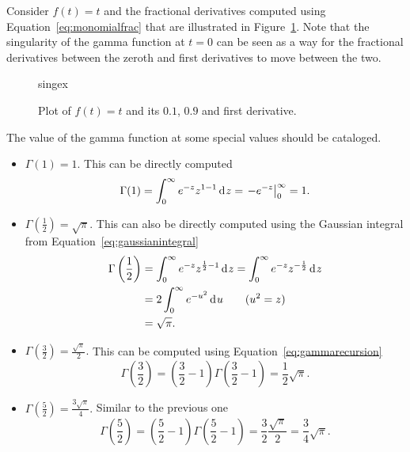 \begin{example}
  Consider $f(t) = t$ and the fractional derivatives computed using Equation~\ref{eq:monomialfrac} that are illustrated in Figure~\ref{fig:singex}. Note that the singularity of the gamma function at $t=0$ can be seen as a way for the fractional derivatives between the zeroth and first derivatives to move between the two.
\end{example}

\begin{figure}
  \centering
  {singex}
  \caption{Plot of $f(t) = t$ and its $0.1$, $0.9$ and first derivative.}
  \label{fig:singex}
\end{figure}

The value of the gamma function at some special values should be cataloged.
\begin{itemize}
  \item $\boxed{ \Gamma(1) = 1. }$ This can be directly computed
    \begin{equation*}
      \Gamma(1) = \int_0^\infty e^{-z} z^{1 - 1} \operatorname{d}\hspace*{-1pt} z = \left. -e^{-z} \right|_0^\infty = 1.
      \end{equation*}
    \item $ \boxed{ \Gamma\left(\frac{1}{2}\right) = \sqrt{\pi}. }$ This can also be directly computed using the Gaussian integral from Equation~\ref{eq:gaussianintegral} 
      \begin{align*}
	\Gamma\left(\frac{1}{2}\right) &= \int_0^\infty e^{-z} z^{\frac{1}{2} - 1} \operatorname{d}\hspace*{-1pt} z 
	= \int_0^\infty e^{-z} z^{-\frac{1}{2}} \operatorname{d}\hspace*{-1pt} z \\ 
	&= 2 \int_0^\infty e^{-u^2} \operatorname{d}\hspace*{-1pt} u \qquad (u^2 = z) \\
	&= \sqrt{\pi}.
      \end{align*}
    \item $ \boxed{ \Gamma\left(\frac{3}{2}\right) = \frac{\sqrt{\pi}}{2}. }$  This can be computed using Equation~\ref{eq:gammarecursion}
      \begin{equation*}
	\Gamma \left( \frac{3}{2} \right) = \left( \frac{3}{2} -1 \right) \Gamma \left( \frac{3}{2} - 1 \right) = \frac{1}{2} \sqrt{\pi}.
      \end{equation*}
    \item $\boxed{ \Gamma\left(\frac{5}{2}\right) = \frac{3 \sqrt{\pi}}{4}. }$ Similar to the previous one
      \begin{equation*}
	\Gamma \left( \frac{5}{2} \right) = \left( \frac{5}{2} - 1 \right) \Gamma \left( \frac{5}{2} - 1 \right) = \frac{3}{2} \frac{\sqrt{\pi}}{2} = \frac{3}{4} \sqrt{\pi}.

\end{equation*}
\end{itemize}
